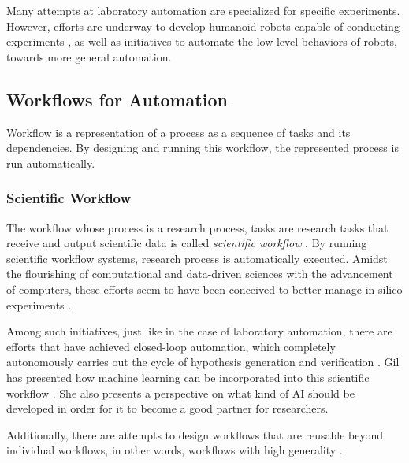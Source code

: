 Many attempts at laboratory automation are specialized for specific experiments. However, efforts are underway to develop humanoid robots capable of conducting experiments \cite{yachie2017robotic}, as well as initiatives to automate the low-level behaviors of robots, towards more general automation.


\subsection{Workflows for Automation}
Workflow is a representation of a process as a sequence of tasks and its dependencies. By designing and running this workflow, the represented process is run automatically.

\subsubsection{Scientific Workflow}
The workflow whose process is a research process, tasks are research tasks that receive and output scientific data is called \textit{scientific workflow} \cite{ludascher2009scientific}. By running scientific workflow systems, research process is automatically executed.  Amidst the flourishing of computational and data-driven sciences with the advancement of computers, these efforts seem to have been conceived to better manage in silico experiments \cite{liew2016scientific}. 

Among such initiatives, just like in the case of laboratory automation, there are efforts that have achieved closed-loop automation, which completely autonomously carries out the cycle of hypothesis generation and verification \cite{gil2017towards}. Gil has presented how machine learning can be incorporated into this scientific workflow \cite{gil2022will}. She also presents a perspective on what kind of AI should be developed in order for it to become a good partner for researchers.

Additionally, there are attempts to design workflows that are reusable beyond individual workflows, in other words, workflows with high generality \cite{hardisty2020canonical}.


